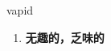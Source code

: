 
\begin{frame}
{\huge vapid}
\begin{center}
\begin{enumerate}\Large
  \item \textbf{无趣的，乏味的}
\end{enumerate}
\end{center}
\end{frame}
